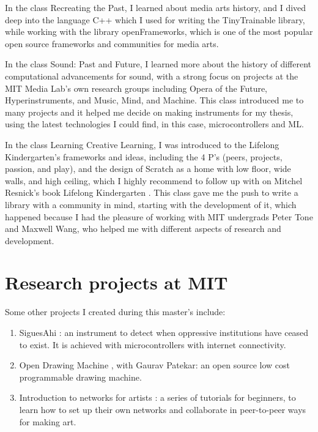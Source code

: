 In the class Recreating the Past, I learned about media arts history, and I dived deep into the language C++ which I used for writing the TinyTrainable library, while working with the library openFrameworks, which is one of the most popular open source frameworks and communities for media arts.

In the class Sound: Past and Future, I learned more about the history of different computational advancements for sound, with a strong focus on projects at the MIT Media Lab's own research groups including Opera of the Future, Hyperinstruments, and Music, Mind, and Machine. This class introduced me to many projects and it helped me decide on making instruments for my thesis, using the latest technologies I could find, in this case, microcontrollers and \acrshort{ML}.

In the class Learning Creative Learning, I was introduced to the Lifelong Kindergarten's frameworks and ideas, including the 4 P's (peers, projects, passion, and play), and the design of Scratch as a home with low floor, wide walls, and high ceiling, which I highly recommend to follow up with  on Mitchel Resnick's book Lifelong Kindergarten \cite{lifelong-kindergarten}. This class gave me the push to write a library with a community in mind, starting with the development of it, which happened because I had the pleasure of working with MIT undergrads Peter Tone and Maxwell Wang, who helped me with different aspects of research and development.

\section{Research projects at MIT}

Some other projects I created during this master's include:

\begin{enumerate}
  \item SiguesAhi \cite{website-library-siguesahi}: an instrument to detect when oppressive institutions have ceased to exist. It is achieved with microcontrollers with internet connectivity.
  \item Open Drawing Machine \cite{website-open-drawing-machine}, with Gaurav Patekar: an open source low cost programmable drawing machine.
  \item Introduction to networks for artists \cite{website-intro-to-computer-networks-for-artists}: a series of tutorials for beginners, to learn how to set up their own networks and collaborate in peer-to-peer ways for making art.
\end{enumerate}

